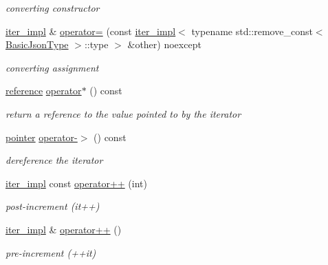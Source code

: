 \begin{DoxyCompactItemize}
\begin{DoxyCompactList}\small\item\em converting constructor \end{DoxyCompactList}\item 
\hyperlink{classnlohmann_1_1detail_1_1iter__impl}{iter\+\_\+impl} \& \hyperlink{classnlohmann_1_1detail_1_1iter__impl_a7159ed1cfe7c423a2baef8bea0c94509}{operator=} (const \hyperlink{classnlohmann_1_1detail_1_1iter__impl}{iter\+\_\+impl}$<$ typename std\+::remove\+\_\+const$<$ \hyperlink{classnlohmann_1_1detail_1_1iter__impl_abf18f18793f84b0222aebb5a2a87da7a}{Basic\+Json\+Type} $>$\+::type $>$ \&other) noexcept
\begin{DoxyCompactList}\small\item\em converting assignment \end{DoxyCompactList}\item 
\hyperlink{classnlohmann_1_1detail_1_1iter__impl_a5be8001be099c6b82310f4d387b953ce}{reference} \hyperlink{classnlohmann_1_1detail_1_1iter__impl_a5ca57856d9bba54a5fc51cee891de827}{operator$\ast$} () const
\begin{DoxyCompactList}\small\item\em return a reference to the value pointed to by the iterator \end{DoxyCompactList}\item 
\hyperlink{classnlohmann_1_1detail_1_1iter__impl_a69e52f890ce8c556fd68ce109e24b360}{pointer} \hyperlink{classnlohmann_1_1detail_1_1iter__impl_a6da3d2b34528aff328f3dcb513076dec}{operator-\/$>$} () const
\begin{DoxyCompactList}\small\item\em dereference the iterator \end{DoxyCompactList}\item 
\hyperlink{classnlohmann_1_1detail_1_1iter__impl}{iter\+\_\+impl} const \hyperlink{classnlohmann_1_1detail_1_1iter__impl_a7d2397773b2dce42f30f0375a6a1d850}{operator++} (int)
\begin{DoxyCompactList}\small\item\em post-\/increment (it++) \end{DoxyCompactList}\item 
\hyperlink{classnlohmann_1_1detail_1_1iter__impl}{iter\+\_\+impl} \& \hyperlink{classnlohmann_1_1detail_1_1iter__impl_abdfe2a7f464400a7ab572782d14b922f}{operator++} ()
\begin{DoxyCompactList}\small\item\em pre-\/increment (++it) \end{DoxyCompactList}\item 

\end{DoxyCompactItemize}
